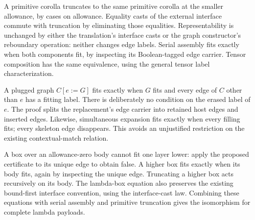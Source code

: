 




A primitive corolla truncates to the same primitive corolla at the
smaller allowance, by cases on allowance. Equality casts of the external
interface commute with truncation by eliminating those equalities.
Representability is unchanged by either the translation's interface casts
or the graph constructor's reboundary operation: neither changes edge labels.
Serial assembly fits exactly when both components fit, by inspecting its
Boolean-tagged edge carrier. Tensor composition has the same equivalence,
using the general tensor label characterization.







A plugged graph $C[e:=G]$ fits exactly when $G$ fits and every edge of $C$
other than $e$ has a fitting label. There is deliberately no condition on the
erased label of $e$. The proof splits the replacement's edge carrier into
retained host edges and inserted edges. Likewise, simultaneous expansion fits
exactly when every filling fits; every skeleton edge disappears. This avoids
an unjustified restriction on the existing contextual-match relation.



A box over an allowance-zero body cannot fit one layer lower: apply
the proposed certificate to its unique edge to obtain false. A higher box fits
exactly when its body fits, again by inspecting the unique edge. Truncating a
higher box acts recursively on its body. The lambda-box equation also preserves
the existing bound-first interface convention, using the interface-cast law.
Combining these equations with serial assembly and primitive truncation gives
the isomorphism for complete lambda payloads.

